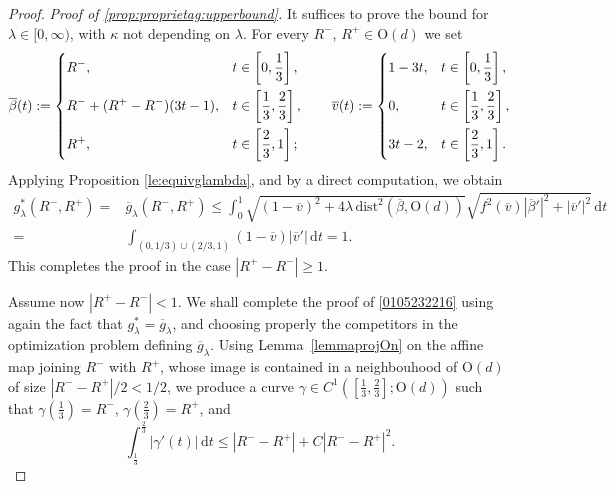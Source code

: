 \documentclass[10pt,a4paper]{amsart}
\newcommand{\On}{\mathrm{O}(d)}
\newcommand\dist{{\mathrm{dist}}}
\newcommand\dt{{\,\mathrm{d}t}}
\newcommand{\ol}{\overline}
\begin{document}
\begin{proof} 
\noindent \textit{Proof of \ref{prop:proprietag:upperbound}.}
It suffices to prove the bound for $\lambda\in [0,\infty)$, with $\kappa$ not depending on $\lambda$.
For every $ R^-$, $ R^+\in\On$ we set
\[
\ol\beta(t):=
\begin{dcases}
	 R^-, & t\in \left[0,\frac13\right], \\
R^-+(R^+-R^-)(3t-1), &   t\in \left[\frac13,\frac23\right], \\
	 R^+,&  t\in \left[\frac23,1\right];
\end{dcases}
\qquad 
\ol v(t) :=
\begin{dcases}
	1-3t, &  t\in \left[0,\frac13\right], \\
	0, &   t\in  \left[\frac13,\frac23\right], \\
	3t-2, &  t\in  \left[\frac23,1\right] .
\end{dcases}
\]	
Applying Proposition \ref{le:equivglambda}, and by a direct computation, we obtain
\begin{equation}\label{eqglambdale1}
\begin{split}
	g^*_\lambda( R^-, R^+) =& \ol g_\lambda( R^-, R^+) 
	\leq   \int_0^1 \sqrt{(1-\ol v)^2+4\lambda\, \dist^2(\ol\beta,\On)} \sqrt{f^2(\ol v) |\ol\beta'|^2+|\ol v'|^2} \dt\\
	= & \int_{(0,1/3)\cup (2/3,1)}(1-\ol v) |\ol v'| \dt= 1.
\end{split}
\end{equation}
This completes the proof in the case
$|R^+-R^-|\ge 1$.

Assume now
$|R^+-R^-|< 1$.
We shall complete the proof of \eqref{0105232216} using again the fact that $g^*_\lambda=\ol g_\lambda$, and choosing properly the competitors in the optimization problem defining $\ol g_\lambda$.
Using Lemma~\ref{lemmaprojOn} on the affine map joining $R^-$ with $R^+$, whose image is contained in a neighbouhood of $\On$ of size $|R^--R^+|/2<1/2$, we produce a curve 
$\gamma\in C^1([\frac13, \frac23];\On)$ such that
$\gamma(\frac13)=R^-$, $\gamma(\frac23)=R^+$, and
\[
\int_{\frac13}^{\frac23} |\gamma'(t)|\dt\le  |R^--R^+|+C|R^--R^+|^2.
\]  



\end{proof}
\end{document}
